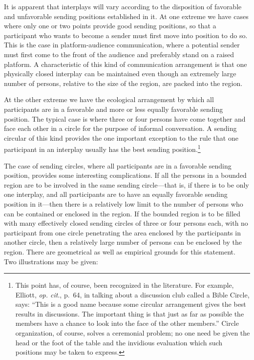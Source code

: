 \documentclass[openany,nobib]{tufte-book}
\begin{document}
It is apparent that interplays will vary according to the disposition of
favorable and unfavorable sending positions established in it. At one
extreme we have cases where only one or two points provide good sending
positions, so that a participant who wants to become a sender must first
move into position to do so. This is the case in platform-audience
communication, where a potential sender must first come to the front of
the audience and preferably stand on a raised platform. A characteristic
of this kind of communication arrangement is that one physically closed
interplay can be maintained even though an extremely large number of
persons, relative to the size of the region, are packed into the region.

At the other extreme we have the ecological arrangement by which all
participants are in a favorable and more or less equally favorable
sending position. The typical case is where three or four persons have
come together and face each other in a circle for the purpose of
informal conversation. A sending circular of this kind provides the one
important exception to the rule that one participant in an interplay
usually has the best sending position.\footnote{This point has, of
  course, been recognized in the literature. For example, Elliott,
  \emph{op. cit}., p.~64, in talking about a discussion club called a
  Bible Circle, says: ``This is a good name because some circular
  arrangement gives the best results in discussions. The important thing
  is that just as far as possible the members have a chance to look into
  the face of the other members.'' Circle organization, of course,
  solves a ceremonial problem; no one need be given the head or the foot
  of the table and the invidious evaluation which such positions may be
  taken to express.}

The case of sending circles, where all participants are in a favorable
sending position, provides some interesting complications. If all the
persons in a bounded region are to be involved in the same sending
circle---that is, if there is to be only one interplay, and all
participants are to have an equally favorable sending position in
it---then there is a relatively low limit to the number of persons who
can be contained or enclosed in the region. If the bounded region is to
be filled with many effectively closed sending circles of three or four
persons each, with no participant from one circle penetrating the area
enclosed by the participants in another circle, then a relatively large
number of persons can be enclosed by the region. There are geometrical
as well as empirical grounds for this statement. Two illustrations may
be given:
\end{document}
